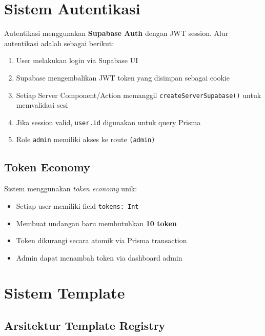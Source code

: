 \documentclass[12pt,a4paper]{article}
\begin{document}
\section{Sistem Autentikasi}

Autentikasi menggunakan \textbf{Supabase Auth} dengan JWT session.
Alur autentikasi adalah sebagai berikut:

\begin{enumerate}
  \item User melakukan login via Supabase UI
  \item Supabase mengembalikan JWT token yang disimpan sebagai cookie
  \item Setiap Server Component/Action memanggil \texttt{createServerSupabase()} untuk memvalidasi sesi
  \item Jika session valid, \texttt{user.id} digunakan untuk query Prisma
  \item Role \texttt{admin} memiliki akses ke route \texttt{(admin)}
\end{enumerate}

\subsection{Token Economy}

Sistem menggunakan \textit{token economy} unik:
\begin{itemize}
  \item Setiap user memiliki field \texttt{tokens: Int}
  \item Membuat undangan baru membutuhkan \textbf{10 token}
  \item Token dikurangi secara atomik via Prisma transaction
  \item Admin dapat menambah token via dashboard admin
\end{itemize}

\section{Sistem Template}

\subsection{Arsitektur Template Registry}
\end{document}

